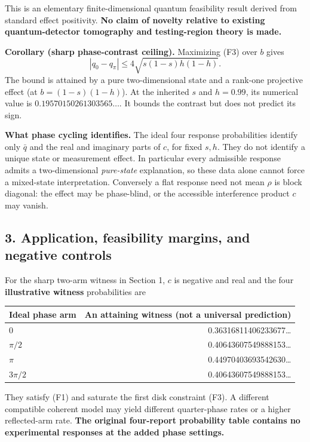 \documentclass[
  10pt,
  a4paper,
]{article}
\begin{document}
This is an elementary finite-dimensional quantum feasibility result derived from standard effect positivity. \textbf{No claim of novelty relative to existing quantum-detector tomography and testing-region theory is made.}

\textbf{Corollary (sharp phase-contrast ceiling).} Maximizing (F3) over \(b\) gives \[
|q_0-q_\pi|\le4\sqrt{s(1-s)h(1-h)}.
\] The bound is attained by a pure two-dimensional state and a rank-one projective effect (at \(b=(1-s)(1-h)\)). At the inherited \(s\) and \(h=0.99\), its numerical value is \(0.19570150261303565\ldots\). It bounds the contrast but does not predict its sign.

\textbf{What phase cycling identifies.} The ideal four response probabilities identify only \(\bar q\) and the real and imaginary parts of \(c\), for fixed \(s,h\). They do not identify a unique state or measurement effect. In particular every admissible response admits a two-dimensional \emph{pure-state} explanation, so these data alone cannot force a mixed-state interpretation. Conversely a flat response need not mean \(\rho\) is block diagonal: the effect may be phase-blind, or the accessible interference product \(c\) may vanish.

\subsection{3. Application, feasibility margins, and negative controls}\label{application-feasibility-margins-and-negative-controls}

For the sharp two-arm witness in Section 1, \(c\) is negative and real and the four \textbf{illustrative witness} probabilities are

\begin{longtable}[]{@{}lr@{}}
\toprule\noalign{}
Ideal phase arm & An attaining witness (not a universal prediction) \\
\midrule\noalign{}
\endhead
\bottomrule\noalign{}
\endlastfoot
\(0\) & 0.36316811406233677\ldots{} \\
\(\pi/2\) & 0.40643607549888153\ldots{} \\
\(\pi\) & 0.44970403693542630\ldots{} \\
\(3\pi/2\) & 0.40643607549888153\ldots{} \\
\end{longtable}

They satisfy (F1) and saturate the first disk constraint (F3). A different compatible coherent model may yield different quarter-phase rates or a higher reflected-arm rate. \textbf{The original four-report probability table contains no experimental responses at the added phase settings.}
\end{document}
